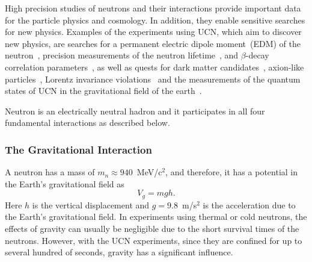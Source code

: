 High precision studies of neutrons and their interactions provide
important data for the particle physics and cosmology. In addition,
they enable sensitive searches for new physics. Examples of the
experiments using UCN, which aim to discover new physics, are searches
for a permanent electric dipole moment~(EDM) of the
neutron~\cite{Baker2006,Serebrov2009,Lam_Gol,Altarev2010,Pendlebury2015},
precision measurements of the neutron
lifetime~\cite{Paul2009,Wietfeldt2011,Arzumanov2000,Serebrov2005,Huffman},
and $\beta$-decay correlation parameters~\cite{Mendenhall,Broussard},
as well as quests for dark matter
candidates~\cite{Serebrov2008,Zimmer2010}, axion-like
particles~\cite{Baessler,Serebrov2010,Afach2015}, Lorentz
invariance violations~\cite{Altarev2009} and the measurements of the
quantum states of UCN in the gravitational field of the
earth~\cite{Nesvizhevsky2003}.


Neutron is an electrically neutral hadron and it participates in all
four fundamental interactions as described below.


\subsubsection{The Gravitational Interaction}
A neutron has a mass of $m_n\approx 940$~MeV/c$^2$, and therefore, it has a
potential in the Earth's gravitational field as
\begin{equation}
V_g=mgh.
\end{equation}
Here $h$ is the vertical displacement and $g=9.8$~m/s$^2$ is the
acceleration due to the Earth's gravitational field.  In experiments
using thermal or cold neutrons, the effects of gravity can usually be
negligible due to the short survival times of the neutrons. However,
with the UCN experiments, since they are confined for up to several
hundred of seconds, gravity has a significant influence.

